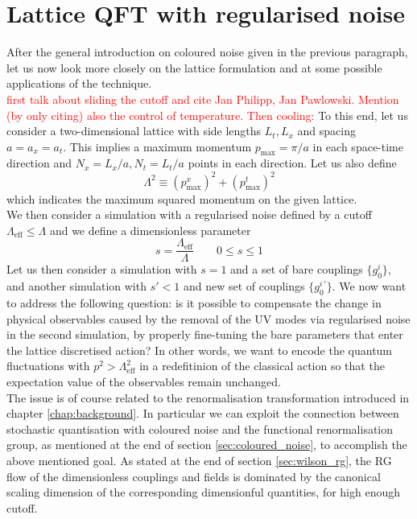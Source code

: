 \section{Lattice QFT with regularised noise}
After the general introduction on coloured noise given in the previous paragraph, let us now look more closely on the lattice formulation and at some possible applications of the technique. \\
\textcolor{red}{first talk about sliding the cutoff and cite Jan Philipp, Jan Pawlowski. Mention (by only citing) also the control of temperature. Then cooling:}
To this end, let us consider a two-dimensional lattice with side lengths $L_t, L_x$ and spacing $a = a_x = a_t$. This implies a maximum momentum $p_\text{max} = \pi / a$ in each space-time direction and $N_x=L_x/a, N_t=L_t/a$ points in each direction. Let us also define 
\begin{equation}
	\Lambda^2 \equiv (p^x_\text{max})^2 + (p^t_\text{max})^2
\end{equation}
which indicates the maximum squared momentum on the given lattice. \\
We then consider a simulation with a regularised noise defined by a cutoff $\Lambda_\text{eff} \leq \Lambda$ and we define a dimensionless parameter
\begin{equation}
	s = \frac{\Lambda_\text{eff}}{\Lambda} \qquad 0 \leq s \leq 1
\end{equation}
Let us then consider a simulation with $s=1$ and a set of bare couplings $\{g^i_0\}$, and another simulation with $s'<1$ and new set of couplings $\{g^{i \, \prime}_0\}$. 
We now want to address the following question: is it possible to compensate the change in physical observables caused by the removal of the UV modes via regularised noise in the second simulation, by properly fine-tuning the bare parameters that enter the lattice discretised action? In other words, we want to encode the quantum fluctuations with $p^2 > \Lambda_\text{eff}^2$ in a redefitinion of the classical action so that the expectation value of the observables remain unchanged.\\
The issue is of course related to the renormalisation transformation introduced in chapter \ref{chap:background}. In particular we can exploit the connection between stochastic quantisation with coloured noise and the functional renormalisation group, as mentioned at the end of section \ref{sec:coloured_noise}, to accomplish the above mentioned goal. As stated at the end of section \ref{sec:wilson_rg}, the RG flow of the dimensionless couplings and fields is dominated by the canonical scaling dimension of the corresponding dimensionful quantities, for high enough cutoff. 
